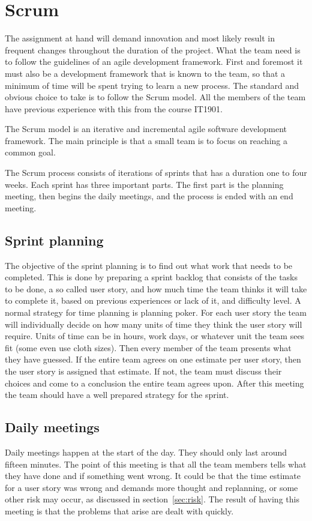 \section{Scrum}

The assignment at hand will demand innovation and most likely result in frequent changes throughout the duration of the project.
What the team need is to follow the guidelines of an agile development framework. First and foremost it must also be a development framework that is known to the team,
so that a minimum of time will be spent trying to learn a new process.
The standard and obvious choice to take is to follow the Scrum model. All the members of the team have previous experience with this from the course IT1901.

The Scrum model is an iterative and incremental agile software development framework.
The main principle is that a small team is to focus on reaching a common goal.

The Scrum process consists of iterations of sprints that has a duration one to four weeks. Each sprint has three important parts.
The first part is the planning meeting, then begins the daily  meetings, and the process is ended with an end meeting.

\subsection{Sprint planning}
The objective of the sprint planning is to find out what work that needs to be completed. This is done by preparing a
sprint backlog that consists of the tasks to be done, a so called user story, and how much time the team thinks it 
will take to complete it, based on previous experiences or lack of it, and difficulty level. 
A normal strategy for time planning is planning poker. 
For each user story the team will individually decide on how many units of time they think the user story will require. 
Units of time can be in hours, work days, or whatever unit the team sees fit (some even use cloth sizes).
Then every member of the team presents what they have guessed. If the entire team agrees on one estimate per user story,
then the user story is assigned that estimate. If not, the team must discuss their choices and come to a conclusion 
the entire team agrees upon.
After this meeting the team should have a well prepared strategy for the sprint.

\subsection{Daily meetings}
Daily meetings happen at the start of the day. They should only last around fifteen minutes. 
The point of this meeting is that all the team members tells what they have done and if something went wrong.
It could be that the time estimate for a user story was wrong and demands more thought and replanning, 
or some other risk may occur, as discussed in section~\ref{sec:risk}. 
The result of having this meeting is that the problems that arise are dealt with quickly.

